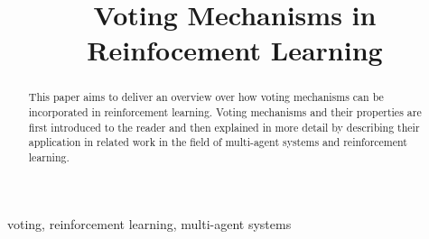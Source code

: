 \documentclass[conference]{IEEEtran}
\begin{document}
\title{Voting Mechanisms in Reinfocement Learning}

\author{
}

\maketitle


\begin{abstract}
This paper aims to deliver an overview over how voting mechanisms can be incorporated in reinforcement learning.
Voting mechanisms and their properties are first introduced to the reader and then explained in more detail by describing their application in related work in the field of multi-agent systems and reinforcement learning.
\end{abstract}

\begin{IEEEkeywords}
voting, reinforcement learning, multi-agent systems
\end{IEEEkeywords}

\end{document}
